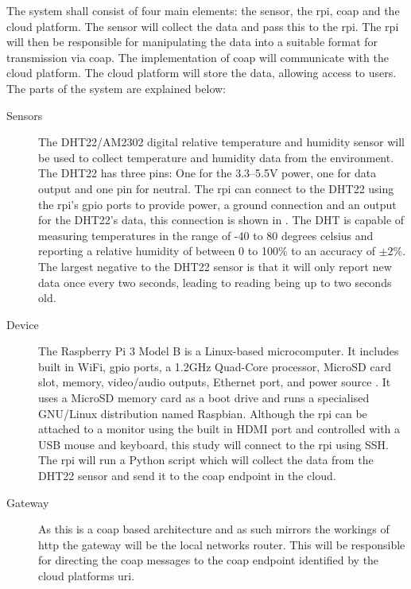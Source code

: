 The system shall consist of four main elements: the sensor, the \gls{rpi}, \gls{coap} and the cloud platform.
The sensor will collect the data and pass this to the \gls{rpi}. The \gls{rpi} will then be responsible for manipulating
the data into a suitable format for transmission via \gls{coap}. The implementation of \gls{coap} will communicate with
the cloud platform. The cloud platform will store the data, allowing access to users.
The parts of the system are explained below:

\begin{description}
    \item[Sensors] 
    The DHT22/AM2302 digital relative temperature and humidity 
    sensor will be used to collect temperature and humidity data from the environment.
    The DHT22 has three pins: One for the 3.3--5.5V power, one for data output and
    one pin for neutral. The \gls{rpi} can connect to the DHT22 using the \gls{rpi}'s 
    \gls{gpio} ports to provide power, a ground connection and an output for the 
    DHT22's data, this connection is shown in . The DHT 
    is capable of measuring temperatures in the range of -40 to 80 degrees celsius
    and reporting a relative humidity of between 0 to 100\% to an accuracy of $\pm2$\%.
    The largest negative to the DHT22 sensor is that it will only report new data
    once every two seconds, leading to reading being up to two seconds old.

    \item[Device]
    The Raspberry Pi 3 Model B is a Linux-based microcomputer.
    It includes built in WiFi, \gls{gpio} ports, a 1.2GHz Quad-Core processor,
    MicroSD card slot, memory, video/audio outputs, Ethernet port, and power source 
    \citep{pi_model_2018}. 
    It uses a MicroSD memory card as a boot drive and runs a specialised 
    GNU/Linux distribution named Raspbian. Although the \gls{rpi} can be attached
    to a monitor using the built in HDMI port and controlled with a USB mouse and
    keyboard, this study will connect to the \gls{rpi} using SSH. The \gls{rpi} 
    will run a Python script which will collect the data from the DHT22 sensor 
    and send it to the \gls{coap} endpoint in the cloud.

    \item[Gateway]
    As this is a \gls{coap} based architecture and as such mirrors the workings
    of \gls{http} the gateway will be the local networks router. This will be 
    responsible for directing the \gls{coap} messages to the \gls{coap} endpoint
    identified by the cloud platforms \gls{uri}.


\end{description}

